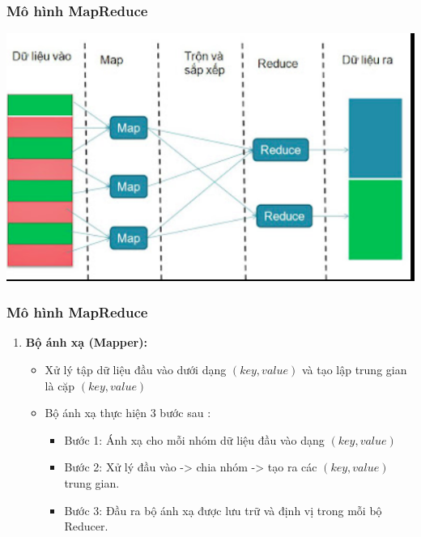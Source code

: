 \documentclass[12pt]{beamer}
\begin{document}
	\begin{frame}
		\frametitle{Mô hình MapReduce}
		\includegraphics[width=\linewidth]{MapReduce.png}
	\end{frame}

	\begin{frame}
		\frametitle{Mô hình MapReduce}
		\begin{enumerate} [\textbf{2.}]
			\item \textbf{Bộ ánh xạ (Mapper):}
				\begin{itemize}
					\item Xử lý tập dữ liệu đầu vào dưới dạng $(key, value)$ và tạo lập trung gian là cặp $(key, value)$
					\item Bộ ánh xạ thực hiện 3 bước sau :
						\begin{itemize}
							\item Bước 1: Ánh xạ cho mỗi nhóm dữ liệu đầu vào dạng $(key, value)$
							\item Bước 2: Xử lý đầu vào -> chia nhóm -> tạo ra các $(key, value)$ trung gian.
							\item Bước 3: Đầu ra bộ ánh xạ được lưu trữ và định vị trong mỗi bộ Reducer.
						\end{itemize}
				\end{itemize}
		\end{enumerate}
	\end{frame}
\end{document}
